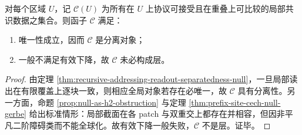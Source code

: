 \begin{proposition}[区域共识函子的分离而非层化]\label{prop:conclusion-consensus-functor-separated-not-sheaf}
对每个区域 \(U\)，记 \(\mathcal C(U)\) 为所有在 \(U\) 上协议可接受且在重叠上可比较的局部共识数据之集合。则函子 \(\mathcal C\) 满足：
\begin{enumerate}
  \item 唯一性成立，因而 \(\mathcal C\) 是分离对象；
  \item 一般不满足有效下降，故 \(\mathcal C\) 未必构成层。
\end{enumerate}
\end{proposition}
\begin{proof}
由定理 \ref{thm:recursive-addressing-readout-separatedness-null}，一旦局部读出在有限覆盖上逐块一致，则相应全局对象若存在必唯一，故 \(\mathcal C\) 具有分离性。另一方面，命题 \ref{prop:null-as-h2-obstruction} 与定理 \ref{thm:prefix-site-cech-null-gerbe} 给出标准情形：局部截面在各 patch 与双重交上都存在并相容，但因非平凡二阶障碍类而不能全球化。故有效下降一般失败，\(\mathcal C\) 不是层。证毕。
\end{proof}

